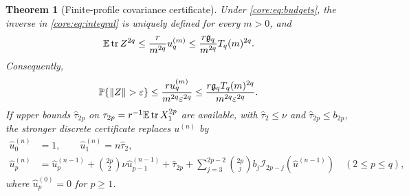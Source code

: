 \documentclass[11pt,a4paper]{article}
\newtheorem{theorem}{Theorem}[section]
\theoremstyle{definition}\newtheorem{definition}[theorem]{Definition}
\theoremstyle{remark}\newtheorem{remark}[theorem]{Remark}
\numberwithin{equation}{section}
\newcommand{\gmom}{\mathfrak g}
\newcommand{\norm}[1]{\lVert#1\rVert}\newcommand{\ip}[2]{\langle#1,#2\rangle}
\DeclareMathOperator{\tr}{tr}\DeclareMathOperator{\rank}{rank}
\begin{document}
\begin{theorem}[Finite-profile covariance certificate]\label{core:thm:finite}
Under \eqref{core:eq:budgets}, the inverse in
\eqref{core:eq:integral} is uniquely defined for every $m>0$, and
\begin{equation}\label{core:eq:finite-moment}
 \E\tr Z^{2q}\le\frac r{m^{2q}}u_q^{(m)}
 \le\frac{r\gmom_q}{m^{2q}}T_q(m)^{2q}.
\end{equation}
Consequently,
\begin{equation}\label{core:eq:finite-tail}
 \Pp\{\norm Z>\varepsilon\}\le
 \frac{r u_q^{(m)}}{m^{2q}\varepsilon^{2q}}
 \le\frac{r\gmom_qT_q(m)^{2q}}{m^{2q}\varepsilon^{2q}}.
\end{equation}
If upper bounds $\widehat\tau_{2p}$ on
$\tau_{2p}=r^{-1}\E\tr X_1^{2p}$ are available, with
$\widehat\tau_2\le\nu$ and $\widehat\tau_{2p}\le b_{2p}$, the stronger
discrete certificate replaces $u^{(n)}$ by
\begin{align}\label{core:eq:refined-discrete}
 \widehat u_0^{(n)}&=1,\qquad
 \widehat u_1^{(n)}=n\widehat\tau_2,\nonumber\\
 \widehat u_p^{(n)}&=\widehat u_p^{(n-1)}
 +\binom{2p}{2}\nu\widehat u_{p-1}^{(n-1)}+\widehat\tau_{2p}
 +\sum_{j=3}^{2p-2}\binom{2p}{j}b_j
                 \mathcal I_{2p-j}(\widehat u^{(n-1)})
 \quad(2\le p\le q),
\end{align}
where $\widehat u_p^{(0)}=0$ for $p\ge1$.
\end{theorem}
\end{document}
